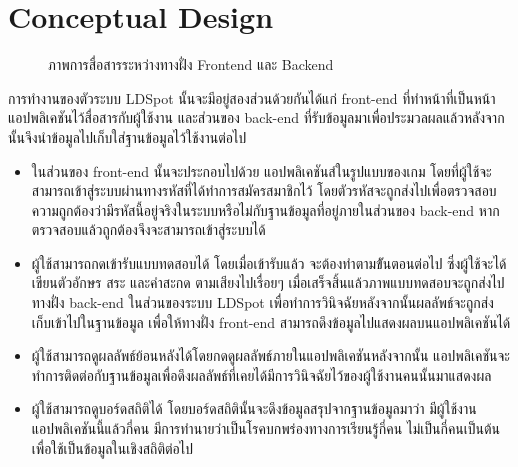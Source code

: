 \documentclass[12pt,oneside,openright,a4paper]{cpe-thai-project}
\begin{document}
\section{Conceptual  Design}
\begin{figure}[!ht]\centering
  \setlength{\fboxrule}{0.2mm} %
  \setlength{\fboxsep}{1cm}
  \caption{ภาพการสื่อสารระหว่างทางฝั่ง Frontend และ Backend}\label{fig:conceptual}
 \end{figure}
 การทำงานของตัวระบบ LDSpot นั้นจะมีอยู่สองส่วนด้วยกันได้แก่ front-end ที่ทำหน้าที่เป็นหน้าแอปพลิเคชันไว้สื่อสารกับผู้ใช้งาน และส่วนของ back-end ที่รับข้อมูลมาเพื่อประมวลผลแล้วหลังจากนั้นจึงนำข้อมูลไปเก็บใส่ฐานข้อมูลไว้ใช้งานต่อไป 
 \begin{itemize}
   \item ในส่วนของ front-end นั้นจะประกอบไปด้วย แอปพลิเคชันส์ในรูปแบบของเกม โดยที่ผู้ใช้จะสามารถเข้าสู่ระบบผ่านทางรหัสที่ได้ทำการสมัครสมาชิกไว้
    โดยตัวรหัสจะถูกส่งไปเพื่อตรวจสอบความถูกต้องว่ามีรหัสนี้อยู่จริงในระบบหรือไม่กับฐานข้อมูลที่อยู่ภายในส่วนของ back-end หากตรวจสอบแล้วถูกต้องจึงจะสามารถเข้าสู่ระบบได้ 
   \item ผู้ใช้สามารถกดเข้ารับแบบทดสอบได้ โดยเมื่อเข้ารับแล้ว จะต้องทำตามข้ันตอนต่อไป ซึ่งผู้ใช้จะได้เขียนตัวอักษร สระ และคำสะกด ตามเสียงไปเรื่อยๆ เมื่อเสร็จสิ้นแล้วภาพแบบทดสอบจะถูกส่งไปทางฝั่ง back-end 
   ในส่วนของระบบ LDSpot เพื่อทำการวินิจฉัยหลังจากนั้นผลลัพธ์จะถูกส่งเก็บเข้าไปในฐานข้อมูล เพื่อให้ทางฝั่ง front-end สามารถดึงข้อมูลไปแสดงผลบนแอปพลิเคชันได้
   \item ผู้ใช้สามารถดูผลลัพธ์ย้อนหลังได้โดยกดดูผลลัพธ์ภายในแอปพลิเคชันหลังจากนั้น แอปพลิเคชันจะทำการติดต่อกับฐานข้อมูลเพื่อดึงผลลัพธ์ที่เคยได้มีการวินิจฉัยไว้ของผู้ใช้งานคนนั้นมาแสดงผล
   \item ผู้ใช้สามารถดูบอร์ดสถิติได้ โดยบอร์ดสถิตินั้นจะดึงข้อมูลสรุปจากฐานข้อมูลมาว่า มีผู้ใช้งานแอปพลิเคชันนี้แล้วกี่คน มีการทำนายว่าเป็นโรคบกพร่องทางการเรียนรู้กี่คน ไม่เป็นกี่คนเป็นต้น เพื่อใช้เป็นข้อมูลในเชิงสถิติต่อไป
 \end{itemize}
\end{document}
